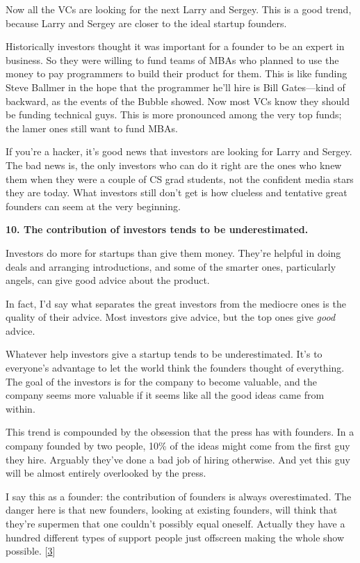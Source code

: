 Now all the VCs are looking for the next Larry and Sergey. This is a
good trend, because Larry and Sergey are closer to the ideal startup
founders.

Historically investors thought it was important for a founder to be an
expert in business. So they were willing to fund teams of MBAs who
planned to use the money to pay programmers to build their product for
them. This is like funding Steve Ballmer in the hope that the programmer
he'll hire is Bill Gates---kind of backward, as the events of the Bubble
showed. Now most VCs know they should be funding technical guys. This is
more pronounced among the very top funds; the lamer ones still want to
fund MBAs.

If you're a hacker, it's good news that investors are looking for Larry
and Sergey. The bad news is, the only investors who can do it right are
the ones who knew them when they were a couple of CS grad students, not
the confident media stars they are today. What investors still don't get
is how clueless and tentative great founders can seem at the very
beginning.

\textbf{10. The contribution of investors tends to be underestimated.}

Investors do more for startups than give them money. They're helpful in
doing deals and arranging introductions, and some of the smarter ones,
particularly angels, can give good advice about the product.

In fact, I'd say what separates the great investors from the mediocre
ones is the quality of their advice. Most investors give advice, but the
top ones give \emph{good} advice.

Whatever help investors give a startup tends to be underestimated. It's
to everyone's advantage to let the world think the founders thought of
everything. The goal of the investors is for the company to become
valuable, and the company seems more valuable if it seems like all the
good ideas came from within.

This trend is compounded by the obsession that the press has with
founders. In a company founded by two people, 10\% of the ideas might
come from the first guy they hire. Arguably they've done a bad job of
hiring otherwise. And yet this guy will be almost entirely overlooked by
the press.

I say this as a founder: the contribution of founders is always
overestimated. The danger here is that new founders, looking at existing
founders, will think that they're supermen that one couldn't possibly
equal oneself. Actually they have a hundred different types of support
people just offscreen making the whole show possible.
{[}\hyperref[f3n]{3}{]}

